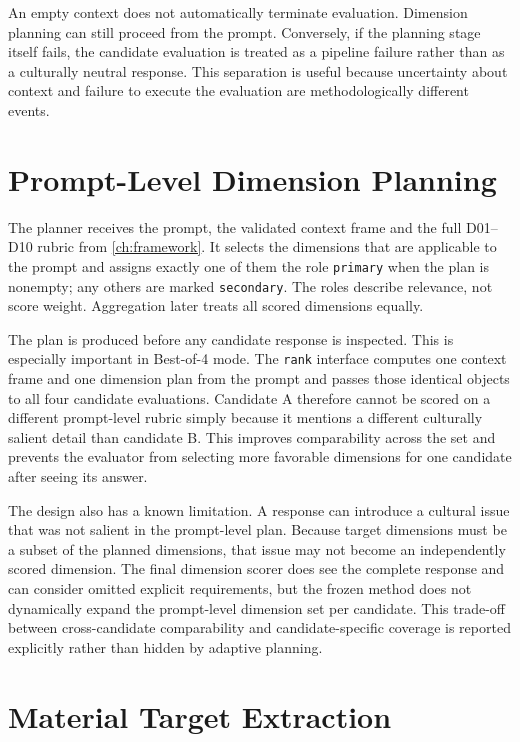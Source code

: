 An empty context does not automatically terminate evaluation. Dimension planning can still proceed from the prompt. Conversely, if the planning stage itself fails, the candidate evaluation is treated as a pipeline failure rather than as a culturally neutral response. This separation is useful because uncertainty about context and failure to execute the evaluation are methodologically different events.

\section{Prompt-Level Dimension Planning}
\label{sec:dimension-planning}

The planner receives the prompt, the validated context frame and the full D01--D10 rubric from \cref{ch:framework}. It selects the dimensions that are applicable to the prompt and assigns exactly one of them the role \texttt{primary} when the plan is nonempty; any others are marked \texttt{secondary}. The roles describe relevance, not score weight. Aggregation later treats all scored dimensions equally.

The plan is produced before any candidate response is inspected. This is especially important in Best-of-4 mode. The \texttt{rank} interface computes one context frame and one dimension plan from the prompt and passes those identical objects to all four candidate evaluations. Candidate A therefore cannot be scored on a different prompt-level rubric simply because it mentions a different culturally salient detail than candidate B. This improves comparability across the set and prevents the evaluator from selecting more favorable dimensions for one candidate after seeing its answer.

The design also has a known limitation. A response can introduce a cultural issue that was not salient in the prompt-level plan. Because target dimensions must be a subset of the planned dimensions, that issue may not become an independently scored dimension. The final dimension scorer does see the complete response and can consider omitted explicit requirements, but the frozen method does not dynamically expand the prompt-level dimension set per candidate. This trade-off between cross-candidate comparability and candidate-specific coverage is reported explicitly rather than hidden by adaptive planning.

\section{Material Target Extraction}
\label{sec:target-extraction}

